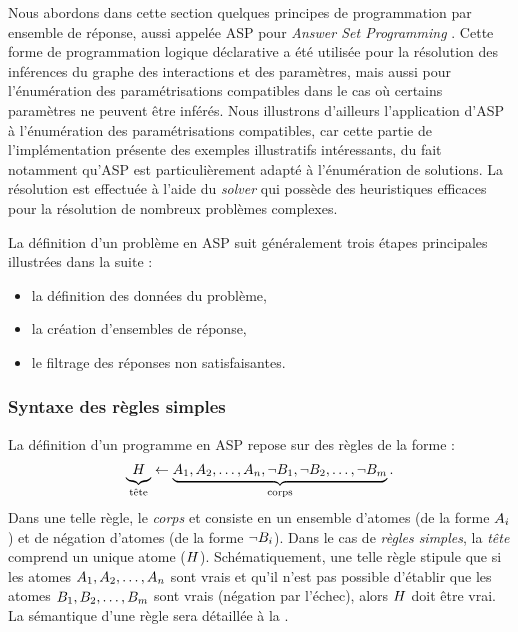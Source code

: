 Nous abordons dans cette section quelques principes de programmation par ensemble de réponse,
aussi appelée ASP pour \textit{Answer Set Programming} \cite{Baral03,Baral10}.
Cette forme de programmation logique déclarative a été utilisée pour la résolution des inférences
du graphe des interactions et des paramètres, mais aussi pour l'énumération des paramétrisations
compatibles dans le cas où certains paramètres ne peuvent être inférés.
Nous illustrons d'ailleurs l'application d'ASP à l'énumération des paramétrisations
compatibles, car cette partie de l'implémentation présente des exemples illustratifs
intéressants, du fait notamment qu'ASP est particulièrement adapté à l'énumération
de solutions.
La résolution est effectuée à l'aide du \textit{solver}  \cite{gekakasc14b}
qui possède des heuristiques efficaces pour la résolution de nombreux
problèmes complexes.

La définition d'un problème en ASP suit généralement trois étapes principales
illustrées dans la suite :
\begin{itemize}
  \item la définition des données du problème,
  \item la création d'ensembles de réponse,
  \item le filtrage des réponses non satisfaisantes.
\end{itemize}



\subsubsection{Syntaxe des règles simples}

La définition d'un programme en ASP repose sur des règles de la forme :
\begin{align*}
  \underbrace{{\ }H_{\ }}_{\text{tête}} \leftarrow \underbrace{A_1, A_2, \dots,
  A_n, \neg B_1, \neg B_2, \dots, \neg B_m}_{\text{corps}}.
\end{align*}
Dans une telle règle, le \emph{corps} et consiste en un ensemble d'atomes
(de la forme $A_i$) et de négation d'atomes (de la forme $\neg B_i$).
Dans le cas de \emph{règles simples}, la \emph{tête} comprend un unique atome ($H$).
Schématiquement,
une telle règle stipule que si les atomes $A_1, A_2, \dots, A_n$
sont vrais et qu'il n'est pas possible d'établir que les atomes
$B_1, B_2, \dots, B_m$ sont vrais (négation par l'échec),
alors $H$ doit être vrai.
La sémantique d'une règle sera détaillée à la .

